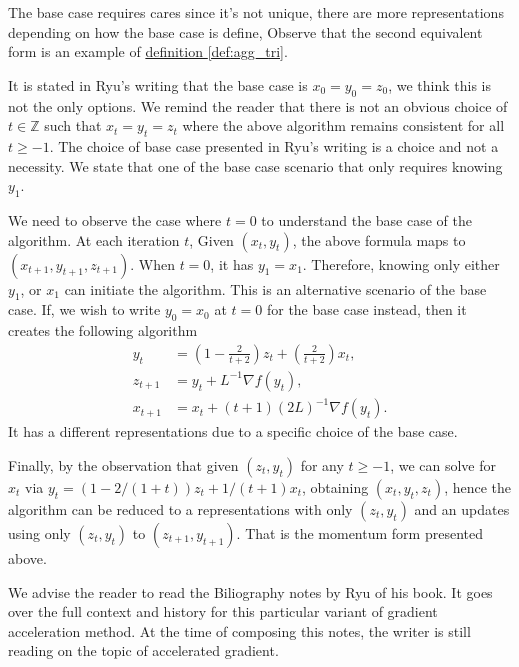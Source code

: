         \begin{observation}
            The base case requires cares since it's not unique, there are more representations  depending on how the base case is define, 
            Observe that the second equivalent form is an example of \hyperref[def:agg_tri]{definition \ref*{def:agg_tri}}. 
            \par\noindent
            It is stated in Ryu's writing that the base case is $x_0 = y_0 = z_0$, 
            we think this is not the only options. 
            We remind the reader that there is not an obvious choice of $t\in \mathbb Z$ such that $x_t = y_t = z_t$ where the above algorithm remains consistent for all $t \ge -1$. 
            The choice of base case presented in Ryu's writing is a choice and not a necessity. 
            We state that one of the base case scenario that only requires knowing $y_1$. 

            \par\noindent 
            We need to observe the case where $t = 0$ to understand the base case of the algorithm. 
            At each iteration $t$, Given $(x_t, y_t)$, the above formula maps to $(x_{t + 1}, y_{t + 1}, z_{t + 1})$. 
            When $t= 0$, it has $y_1 = x_1$. 
            Therefore, knowing only either $y_1$, or $x_1$ can initiate the algorithm. 
            This is an alternative scenario of the base case. 
            If, we wish to write $y_0 = x_0$ at $t = 0$ for the base case instead, then it creates the following algorithm 
            \begin{align*}
                y_{t} &= \left(
                1 - \frac{2}{t + 2} 
                \right)z_{t} + 
                \left(
                    \frac{2}{t + 2}
                \right)x_{t}, 
                \\
                z_{t + 1} &= y_t + L^{-1}\nabla f(y_t), 
                \\
                x_{t + 1} &= x_t + (t + 1)(2L)^{-1}\nabla f(y_t). 
            \end{align*}
            It has a different representations due to a specific choice of the base case. 
            \par\noindent
            Finally, by the observation that given $(z_t, y_t)$ for any $t\ge -1$, we can solve for $x_t$ \newline via $y_t = (1 - 2/(1 + t))z_t + 1/(t + 1)x_t$, obtaining $(x_t, y_t, z_t)$, hence the algorithm can be reduced to a representations with only $(z_t, y_t)$ and an updates using only $(z_t, y_t)$ to $(z_{t + 1}, y_{t + 1})$. 
            That is the momentum form presented above. 
        \end{observation}
        \begin{remark}
            We advise the reader to read the Biliography notes by Ryu \cite[chapter 12]{ryu_large-scale_2022} of his book. 
            It goes over the full context and history for this particular variant of gradient acceleration method. 
            At the time of composing this notes, the writer is still reading on the topic of accelerated gradient.     
        \end{remark}

